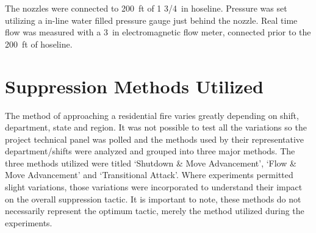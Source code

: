 \documentclass[12pt,oneside]{book}
\begin{document}
The nozzles were connected to 200~ft of 1 3/4~in hoseline. Pressure was set utilizing a in-line water filled pressure gauge just behind the nozzle. Real time flow was measured with a 3~in electromagnetic flow meter, connected prior to the 200~ft of hoseline. %


\clearpage

\section{Suppression Methods Utilized}

The method of approaching a residential fire varies greatly depending on shift, department, state and region. It was not possible to test all the variations so the project technical panel was polled and the methods used by their representative department/shifts were analyzed and grouped into three major methods. The three methods utilized were titled `Shutdown \& Move Advancement', `Flow \& Move Advancement' and `Transitional Attack'. Where experiments permitted slight variations, those variations were incorporated to understand their impact on the overall suppression tactic. It is important to note, these methods do not necessarily represent the optimum tactic, merely the method utilized during the experiments.

\end{document}

